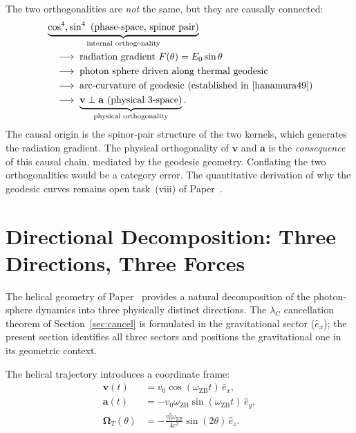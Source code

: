 \documentclass[%
 reprint, amsmath,amssymb, aps, prb, ]{revtex4-2}
\numberwithin{equation}{section}
\newcommand{\iphase}{\theta}
\newcommand{\omZB}{\omega_{\text{ZB}}}
\newcommand{\lambdaC}{\lambda_{\mathrm{C}}}
\newcommand{\OmT}{\boldsymbol{\Omega}_T}
\newcommand{\ehat}[1]{\hat{e}_{#1}}
\begin{document}
The two orthogonalities are \emph{not} the same, but they are causally connected:
\begin{align}
&\underbrace{\cos^4, \sin^4 \text{ (phase-space, spinor pair)}}_{\text{internal orthogonality}}
\notag\\
&\quad\longrightarrow\;
\text{radiation gradient } F(\iphase) = E_0\sin\iphase
\notag\\
&\quad\longrightarrow\;
\text{photon sphere driven along thermal geodesic}
\notag\\
&\quad\longrightarrow\;
\text{arc-curvature of geodesic (established in \cite{hanamura49})}
\notag\\
&\quad\longrightarrow\;
\underbrace{\mathbf{v}\perp\mathbf{a} \text{ (physical 3-space)}}_{\text{physical orthogonality}}.
\label{eq:causal_chain}
\end{align}
The causal origin is the spinor-pair structure of the two kernels, which generates the radiation gradient. The physical orthogonality of $\mathbf{v}$ and $\mathbf{a}$ is the \emph{consequence} of this causal chain, mediated by the geodesic geometry. Conflating the two orthogonalities would be a category error. The quantitative derivation of why the geodesic curves remains open task~(viii) of Paper~\cite{hanamura49}.

\section{Directional Decomposition: Three Directions, Three Forces}
\label{sec:directional}

The helical geometry of Paper~\cite{hanamura51} provides a natural decomposition of the photon-sphere dynamics into three physically distinct directions. The $\lambdaC$ cancellation theorem of Section~\ref{sec:cancel} is formulated in the gravitational sector ($\ehat{x}$); the present section identifies all three sectors and positions the gravitational one in its geometric context.

The helical trajectory introduces a coordinate frame:
\begin{align}
\mathbf{v}(t) &= v_0\cos(\omZB t)\,\ehat{x}, \label{eq:v_helix}\\
\mathbf{a}(t) &= -v_0\omZB\sin(\omZB t)\,\ehat{y}, \label{eq:a_helix}\\
\OmT(\iphase) &= -\frac{v_0^2\omZB}{4c^2}\sin(2\iphase)\,\ehat{z}. \label{eq:OmT_helix}
\end{align}
\end{document}
